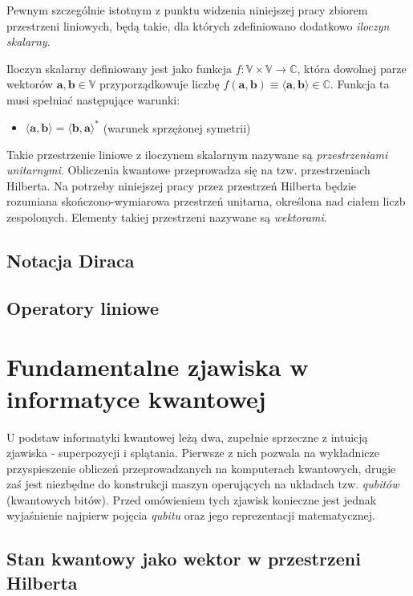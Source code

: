 \documentclass[12pt,a4paper,twoside,openany]{book}
\begin{document}
Pewnym szczególnie istotnym z punktu widzenia niniejszej pracy zbiorem przestrzeni liniowych, będą takie, dla których zdefiniowano dodatkowo \textit{iloczyn skalarny}.\newline

Iloczyn skalarny definiowany jest jako funkcja $f: \mathbb{V}\times\mathbb{V}\to\mathbb{C}$, która dowolnej parze wektorów $\textbf{a}, \textbf{b} \in \mathbb{V}$ przyporządkowuje liczbę $f(\textbf{a}, \textbf{b})\equiv\langle\textbf{a},\textbf{b}\rangle\in\mathbb{C}$. Funkcja ta musi spełniać następujące warunki:
\begin{itemize}
    \item $\langle\textbf{a},\textbf{b}\rangle = \langle\textbf{b},\textbf{a}\rangle ^\ast$  (warunek sprzężonej symetrii)
\end{itemize}

Takie przestrzenie liniowe z iloczynem skalarnym nazywane są \textit{przestrzeniami unitarnymi}. Obliczenia kwantowe przeprowadza się na tzw. przestrzeniach Hilberta. Na potrzeby niniejszej pracy przez przestrzeń Hilberta będzie rozumiana skończono-wymiarowa przestrzeń unitarna, określona nad ciałem liczb zespolonych. Elementy takiej przestrzeni nazywane są \textit{wektorami}.

\subsection{Notacja Diraca}

\subsection{Operatory liniowe}

\section{Fundamentalne zjawiska w informatyce kwantowej}

U podstaw informatyki kwantowej leżą dwa, zupełnie sprzeczne z intuicją zjawiska - superpozycji i splątania. Pierwsze z nich pozwala na wykładnicze przyspieszenie obliczeń przeprowadzanych na komputerach kwantowych, drugie zaś jest niezbędne do konstrukcji maszyn operujących na układach tzw. \textit{qubitów} (kwantowych bitów). Przed omówieniem tych zjawisk konieczne jest jednak wyjaśnienie najpierw pojęcia \textit{qubitu} oraz jego reprezentacji matematycznej.

\subsection{Stan kwantowy jako wektor w przestrzeni Hilberta}
\end{document}
